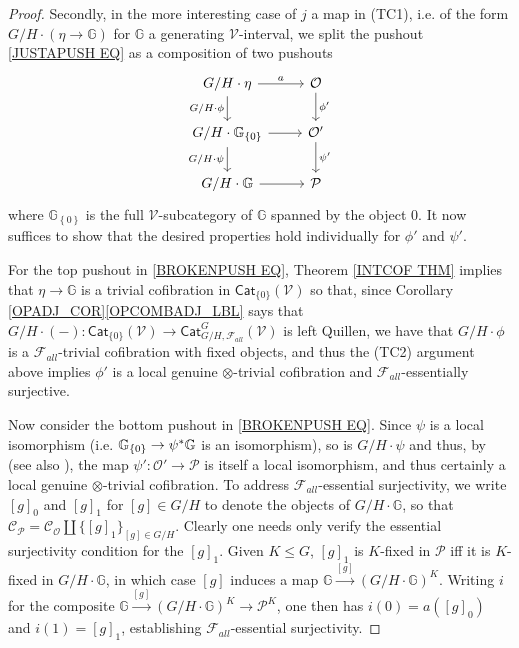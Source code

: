 \documentclass[a4paper,10pt
,draft
]{article}%
\numberwithin{equation}{section}
\numberwithin{figure}{section}
\theoremstyle{definition} %
\newcommand{\set}[1]{\left\{#1\right\}}%
\newcommand{\F}{\ensuremath{\mathcal F}}
\newcommand{\V}{\ensuremath{\mathcal V}}
\renewcommand{\O}{\ensuremath{\mathcal O}}
\renewcommand{\P}{\ensuremath{\mathcal P}}
\newcommand{\C}{\ensuremath{\mathcal C}}
\newcommand{\1}{\ensuremath{\mathbbm 1}}%
\begin{document}
\begin{proof}
     
	Secondly, in the more interesting case of $j$ a map in (TC1), 
	i.e. of the form $G/H \cdot (\eta \to \mathbb{G})$ for $\mathbb{G}$ a generating $\V$-interval,
	we split the pushout \eqref{JUSTAPUSH EQ} as a composition of two pushouts 
\begin{equation}\label{BROKENPUSH EQ}
\begin{tikzcd}
	G/H \cdot \eta \arrow[r, "a"] \arrow[d, "G/H \cdot \phi"']
&
	\O \arrow[d,"\phi'"]
\\
	G/H \cdot \mathbb{G}_{\set{0}} \arrow[r] \arrow[d, "G/H \cdot \psi"']
&
	\O' \arrow[d,"\psi'"]
\\
	G/H \cdot \mathbb{G} \arrow[r]
&
	\P
\end{tikzcd}
\end{equation}
	where $\mathbb{G}_{\set{0}}$ is the full $\V$-subcategory of $\mathbb{G}$ spanned by the object $0$.
	It now suffices to show that the desired properties hold individually for $\phi'$ and $\psi'$.


	For the top pushout in \eqref{BROKENPUSH EQ}, Theorem \ref{INTCOF THM} implies that $\eta \to \mathbb{G}$
	is a trivial cofibration in $\mathsf{Cat}_{\{0\}}(\V)$
	so that, since Corollary \ref{OPADJ_COR}\ref{OPCOMBADJ_LBL} %
      says that $G/H \cdot (-) \colon \mathsf{Cat}_{\{0\}}(\V) \to \mathsf{Cat}^G_{G/H,\F_{all}}(\V)$ is left Quillen,
      we have that $G/H \cdot \phi$ is a $\F_{all}$-trivial cofibration with fixed objects,
      and thus the (TC2) argument above implies $\phi'$ is
      a local genuine $\otimes$-trivial cofibration and
      $\F_{all}$-essentially surjective.
      
	Now consider the bottom pushout in \eqref{BROKENPUSH EQ}.
	Since $\psi$ is a local isomorphism (i.e. $\mathbb{G}_{\{0\}} \to \psi^{\**}\mathbb{G}$ is an isomorphism),
	so is $G/H \cdot \psi$ and thus, by 
	\cite[Cor. \ref{OC-LOCALISO_COR}]{BP_FCOP}
	(see also \cite[Prop. B.22]{Cav}),
	the map $\psi' \colon \O' \to \mathcal{P}$
	is itself a local isomorphism, and thus certainly a local genuine $\otimes$-trivial cofibration.
% 
	To address $\F_{all}$-essential surjectivity, 
	we write $[g]_0$ and $[g]_1$ for $[g] \in G/H$
	to denote the objects of $G/H \cdot \mathbb{G}$,
	so that $\C_{\P} = \C_{\O} \amalg \{[g]_1\}_{[g] \in G/H}$.
	Clearly one needs only verify the essential surjectivity condition for the $[g]_1$.
	Given $K \leq G$,
	$[g]_1$ is $K$-fixed in $\P$ iff it is $K$-fixed in $G/H \cdot \mathbb{G}$,
	in which case $[g]$ induces a map
	$\mathbb{G} \xrightarrow{[g]} \left(G/H \cdot \mathbb{G}\right)^K$.
	Writing $i$ for the composite 
	$\mathbb{G} \xrightarrow{[g]} \left(G/H \cdot \mathbb{G}\right)^K \to \P^K$,
	one then has $i(0) = a([g]_0)$ and $i(1)=[g]_1$,
	establishing $\F_{all}$-essential surjectivity.
\end{proof}
\end{document}
